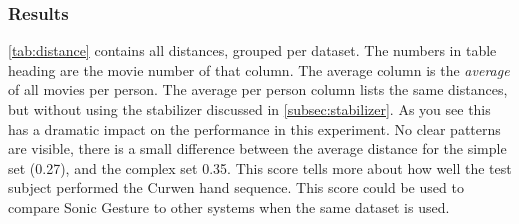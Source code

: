 \subsubsection{Results}
\autoref{tab:distance} contains all distances, grouped per dataset. The numbers in table heading are the movie number of that column. The average column is the \textit{average} of all movies per person. The average per person column lists the same distances, but without using the stabilizer discussed in \autoref{subsec:stabilizer}. As you see this has a dramatic impact on the performance in this experiment. No clear patterns are visible, there is a small difference between the average distance for the simple set (0.27), and the complex set 0.35. This score tells more about how well the test subject performed the Curwen hand sequence. This score could be used to compare Sonic Gesture to other systems when the same dataset is used. 


